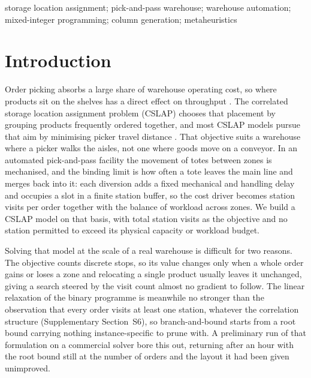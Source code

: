 \documentclass[]{interact}
\begin{document}
\begin{keywords}
storage location assignment; pick-and-pass warehouse; warehouse automation; mixed-integer programming; column generation; metaheuristics
\end{keywords}


\section{Introduction}
Order picking absorbs a large share of warehouse operating cost, so where products sit on the shelves has a direct effect on throughput \citep{xie2024combi}. The correlated storage location assignment problem (CSLAP) chooses that placement by grouping products frequently ordered together, and most CSLAP models pursue that aim by minimising picker travel distance \citep{islam2023}. That objective suits a warehouse where a picker walks the aisles, not one where goods move on a conveyor. In an automated pick-and-pass facility the movement of totes between zones is mechanised, and the binding limit is how often a tote leaves the main line and merges back into it: each diversion adds a fixed mechanical and handling delay and occupies a slot in a finite station buffer, so the cost driver becomes station visits per order together with the balance of workload across zones. We build a CSLAP model on that basis, with total station visits as the objective and no station permitted to exceed its physical capacity or workload budget.

Solving that model at the scale of a real warehouse is difficult for two reasons. The objective counts discrete stops, so its value changes only when a whole order gains or loses a zone and relocating a single product usually leaves it unchanged, giving a search steered by the visit count almost no gradient to follow. The linear relaxation of the binary programme is meanwhile no stronger than the observation that every order visits at least one station, whatever the correlation structure (Supplementary Section~S6), so branch-and-bound starts from a root bound carrying nothing instance-specific to prune with. A preliminary run of that formulation on a commercial solver bore this out, returning after an hour with the root bound still at the number of orders and the layout it had been given unimproved.
\end{document}

